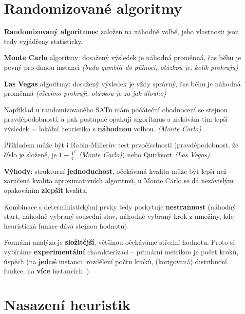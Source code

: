 \section{Randomizované algoritmy}

\textbf{Randomizovaný algoritmus}: založen na náhodné volbě, jeho vlastnosti jsou tedy vyjádřeny statisticky.

\vspace{4pt}
\noindent \textbf{Monte Carlo} algoritmy: dosažený výsledek je náhodná proměnná, čas běhu je pevný pro danou instanci \textit{(budu gamblit do půlnoci, otázkou je, kolik prohraju)}

\vspace{4pt}
\noindent \textbf{Las Vegas} algoritmy: dosažený výsledek je vždy správný, čas běhu je náhodná proměnná \textit{(všechno prohraji, otázkou je za jak dlouho)}

\vspace{4pt}
\noindent Například u randomizovaného SATu mám počáteční ohodnocení se stejnou prav\-děpodobností, a pak postupně opakuji algoritmus a získávám tím lepší výsledek = lokální heuristika s \textbf{náhodnou} volbou. \textit{(Monte Carlo)}

\vspace{4pt}
\noindent Příkladem může být i Rabin-Millerův test prvočíselnosti (pravděpodobnost, že číslo je složené, je $1 - \frac{1}{4}^r$ \textit{(Monte Carlo)}) nebo Quicksort \textit{(Las Vegas)}.

\vspace{4pt}
\noindent \textbf{Výhody}: strukturní \textbf{jednoduchost}, očekávaná kvalita může být lepší než zaručená kvalita aproximativních algoritmů, u Monte Carlo se dá nezávislým opakováním \textbf{zlepšit} kvalita.

\vspace{4pt}
\noindent Kombinace s deterministickými prvky tedy poskytuje \textbf{nestrannost} (náhodný start, náhodně vybraný sousední stav, náhodně vybraný krok z množiny, kde heuristická funkce dává stejnou hodnotu).

\vspace{4pt}
\noindent Formální analýza je \textbf{složitější}, většinou očekáváme střední hodnotu. Proto si vybíráme \textbf{experimentální} charakterizaci -- primární metrikou je počet kroků, úspěch (na \textbf{jedné} instanci: rozdělení počtu kroků, (korigovaná) distribuční funkce, na \textbf{více} instancích: )

\section{Nasazení heuristik}

